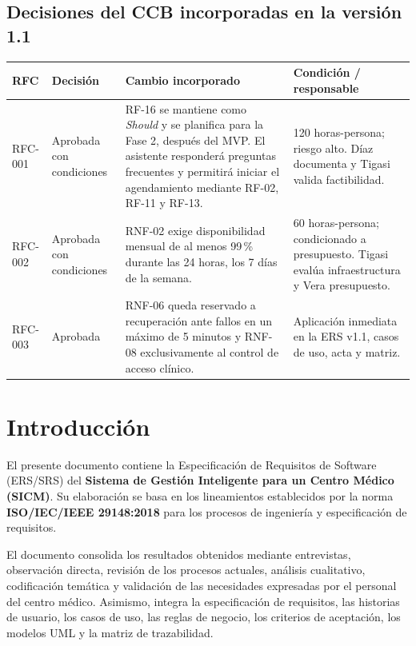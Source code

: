 \documentclass[11pt,a4paper]{article}
\begin{document}
	\subsection*{Decisiones del CCB incorporadas en la versión 1.1}
	\begin{longtable}{@{}p{1.8cm}p{2.2cm}p{7.2cm}p{3.4cm}@{}}
		\toprule
		\textbf{RFC} & \textbf{Decisión} & \textbf{Cambio incorporado} & \textbf{Condición / responsable} \\
		\midrule
		\endhead
		RFC-001 & Aprobada con condiciones & RF-16 se mantiene como \emph{Should} y se planifica para la Fase 2, después del MVP. El asistente responderá preguntas frecuentes y permitirá iniciar el agendamiento mediante RF-02, RF-11 y RF-13. & 120 horas-persona; riesgo alto. Díaz documenta y Tigasi valida factibilidad. \\
		RFC-002 & Aprobada con condiciones & RNF-02 exige disponibilidad mensual de al menos 99\,\% durante las 24 horas, los 7 días de la semana. & 60 horas-persona; condicionado a presupuesto. Tigasi evalúa infraestructura y Vera presupuesto. \\
		RFC-003 & Aprobada & RNF-06 queda reservado a recuperación ante fallos en un máximo de 5 minutos y RNF-08 exclusivamente al control de acceso clínico. & Aplicación inmediata en la ERS v1.1, casos de uso, acta y matriz. \\
		\bottomrule
	\end{longtable}
	
	
	\tableofcontents
	\clearpage
	
	
	\section{ Introducción}
	
	El presente documento contiene la Especificación de Requisitos de Software
	(ERS/SRS) del \textbf{Sistema de Gestión Inteligente para un Centro Médico
		(SICM)}. Su elaboración se basa en los lineamientos establecidos por la norma
	\textbf{ISO/IEC/IEEE 29148:2018} para los procesos de ingeniería y
	especificación de requisitos.
	
	El documento consolida los resultados obtenidos mediante entrevistas,
	observación directa, revisión de los procesos actuales, análisis cualitativo,
	codificación temática y validación de las necesidades expresadas por el
	personal del centro médico. Asimismo, integra la especificación de requisitos,
	las historias de usuario, los casos de uso, las reglas de negocio, los criterios
	de aceptación, los modelos UML y la matriz de trazabilidad.
	
\end{document}
